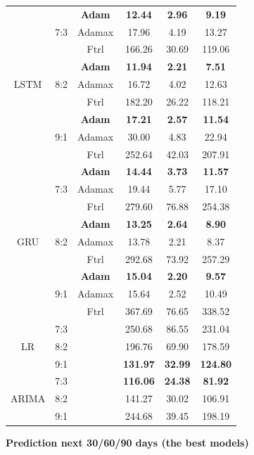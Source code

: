 \documentclass{ieeeojies}
\begin{document}
\begin{table}[H]
\begin{tabular}{|c|c|c|c|c|c|}
        \multirow{9}{*}{LSTM} & \multirow{3}{*}{7:3} & \textbf{Adam} & \textbf{12.44} & \textbf{2.96} & \textbf{9.19} \\ \cline{3-6}
         &  & Adamax & 17.96 & 4.19 & 13.27 \\ \cline{3-6}
         &  & Ftrl & 166.26 & 30.69 & 119.06 \\ \cline{2-6}
         & \multirow{3}{*}{8:2} & \textbf{Adam} & \textbf{11.94} & \textbf{2.21} & \textbf{7.51} \\ \cline{3-6}
         &  & Adamax & 16.72 & 4.02 & 12.63 \\ \cline{3-6}
         &  & Ftrl & 182.20 & 26.22 & 118.21 \\ \cline{2-6}
         & \multirow{3}{*}{9:1} & \textbf{Adam} & \textbf{17.21} & \textbf{2.57} & \textbf{11.54} \\ \cline{3-6}
         &  & Adamax & 30.00 & 4.83 & 22.94 \\ \cline{3-6}
         &  & Ftrl & 252.64 & 42.03 & 207.91 \\ \hline
         
        \multirow{9}{*}{GRU} & \multirow{3}{*}{7:3} & \textbf{Adam} & \textbf{14.44} & \textbf{3.73} & \textbf{11.57} \\ \cline{3-6}
         &  & Adamax & 19.44 & 5.77 & 17.10 \\ \cline{3-6}
         &  & Ftrl & 279.60 & 76.88 & 254.38 \\ \cline{2-6}
         & \multirow{3}{*}{8:2} & \textbf{Adam} & \textbf{13.25} & \textbf{2.64} & \textbf{8.90} \\ \cline{3-6}
         &  & Adamax & 13.78 & 2.21 & 8.37 \\ \cline{3-6}
         &  & Ftrl & 292.68 & 73.92 & 257.29 \\ \cline{2-6}
         & \multirow{3}{*}{9:1} & \textbf{Adam} & \textbf{15.04} & \textbf{2.20} & \textbf{9.57} \\ \cline{3-6}
         &  & Adamax & 15.64 & 2.52 & 10.49 \\ \cline{3-6}
         &  & Ftrl & 367.69 & 76.65 & 338.52 \\ \hline
         
        \multirow{3}{*}{LR} & 7:3 &  & 250.68 & 86.55 & 231.04 \\ \cline{2-6}
         & 8:2 &  & 196.76 & 69.90 & 178.59 \\ \cline{2-6}
         & 9:1 &  & \textbf{131.97} & \textbf{32.99} & \textbf{124.80}
 \\ \hline

        \multirow{3}{*}{ARIMA} & 7:3 &  & \textbf{116.06} & \textbf{24.38} & \textbf{81.92}
 \\ \cline{2-6}
         & 8:2 &  & 141.27 & 30.02 & 106.91 \\ \cline{2-6}
         & 9:1 &  & 244.68 & 39.45 & 198.19 \\ \hline


    \end{tabular}
\end{table}
\textbf{Prediction next 30/60/90 days (the best models)}
\end{document}
